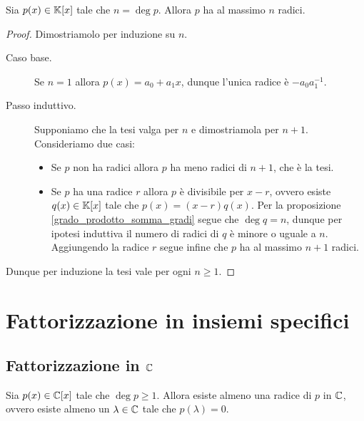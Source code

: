 \begin{proposition}
    Sia $p(x) \in \mathbb{K}[x]$ tale che $n = \deg p$. Allora $p$ ha al massimo $n$ radici.
\end{proposition}
\begin{proof}
    Dimostriamolo per induzione su $n$.
    \begin{description}
        \item[Caso base.] Se $n = 1$ allora $p(x) = a_0 + a_1x$, dunque l'unica radice è $-a_0a_1^{-1}$.
        \item[Passo induttivo.] Supponiamo che la tesi valga per $n$ e dimostriamola per $n+1$. Consideriamo due casi: \begin{itemize}
            \item Se $p$ non ha radici allora $p$ ha meno radici di $n+1$, che è la tesi.
            \item Se $p$ ha una radice $r$ allora $p$ è divisibile per $x-r$, ovvero esiste $q(x) \in \mathbb{K}[x]$ tale che $p(x) = (x-r)q(x)$. Per la proposizione \ref{grado_prodotto_somma_gradi} segue che $\deg q = n$, dunque per ipotesi induttiva il numero di radici di $q$ è minore o uguale a $n$. Aggiungendo la radice $r$ segue infine che $p$ ha al massimo $n + 1$ radici.
        \end{itemize}  
    \end{description}
    Dunque per induzione la tesi vale per ogni $n \geq 1$.
\end{proof}

\section{Fattorizzazione in insiemi specifici}

\subsection{Fattorizzazione in $\mathbb{C}$}

\begin{theorem}
     \label{th_fondamentale_algebra}
    Sia $p(x) \in \mathbb{C}[x]$ tale che $\deg p \geq 1$. Allora esiste almeno una radice di $p$ in $\mathbb{C}$, ovvero esiste almeno un $\lambda \in \mathbb{C}$ tale che $p(\lambda) = 0$.
\end{theorem}


